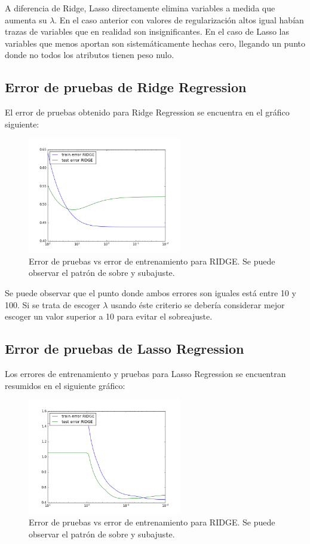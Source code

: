 \documentclass[letter, 10pt]{article}
\begin{document}
A diferencia de Ridge, Lasso directamente elimina variables a medida que aumenta
su $\lambda$. En el caso anterior con valores de regularización altos igual
habían trazas de variables que en realidad son insignificantes. En el caso de
Lasso las variables que menos aportan son sistemáticamente hechas cero, llegando
un punto donde no todos los atributos tienen peso nulo.

\subsection{Error de pruebas de Ridge Regression}
El error de pruebas obtenido para Ridge Regression se encuentra en el gráfico
siguiente:

\begin{figure}[H]
  \centering
  \includegraphics[width=0.6\textwidth]{Images/p3_fig3} 
  \caption{Error de pruebas vs error de entrenamiento para RIDGE. Se puede
    observar el patrón de sobre y subajuste.}
  \label{fig:p3_g2}
\end{figure}

Se puede observar que el punto donde ambos errores son iguales está entre 10 y
100. Si se trata de escoger $\lambda$ usando éste criterio se debería considerar
mejor escoger un valor superior a 10 para evitar el sobreajuste.
\subsection{Error de pruebas de Lasso Regression}
Los errores de entrenamiento y pruebas para Lasso Regression se encuentran
resumidos en el siguiente gráfico:

\begin{figure}[H]
  \centering
  \includegraphics[width=0.6\textwidth]{Images/p3_fig4} 
  \caption{Error de pruebas vs error de entrenamiento para RIDGE. Se puede
    observar el patrón de sobre y subajuste.}
  \label{fig:p3_g2}
\end{figure}
\end{document}
